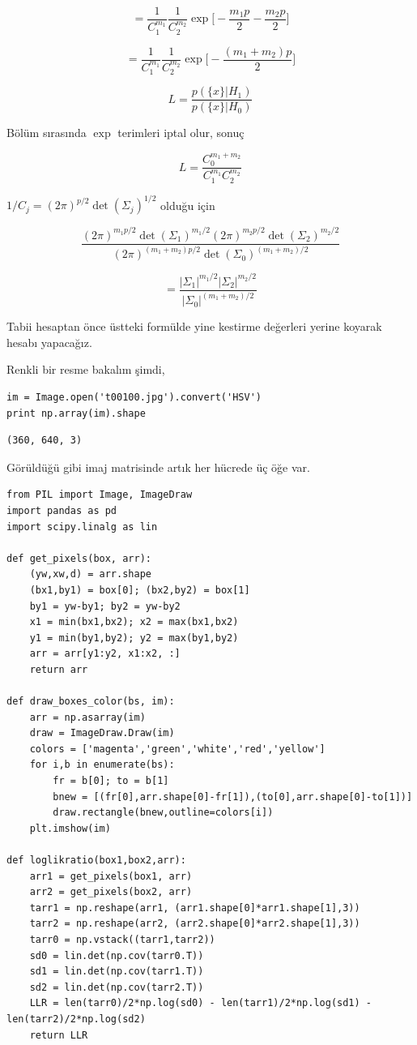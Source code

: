 \documentclass[12pt,fleqn]{article}\usepackage{../../common}
\begin{document}
$$ =
\frac{1}{C_1^{m_1}}\frac{1}{C_2^{m_2}}
\exp\bigg[-\frac{m_1 p}{2} -\frac{m_2 p}{2}\bigg]
$$

$$ =
\frac{1}{C_1^{m_1}}\frac{1}{C_2^{m_2}} \exp\bigg[- \frac{(m_1+m_2) p}{2}\bigg]
$$

$$ L = \frac{p(\{x\}|H_1)}{p(\{x\}|H_0)} $$

Bölüm sırasında $\exp$ terimleri iptal olur, sonuç

$$ L = \frac{C_0^{m_1+m_2}}{C_1^{m_1}C_2^{m_2}  } $$

$1/C_j = (2\pi)^{p/2} \det(\Sigma_j)^{1/2}$ olduğu için

$$
\frac{
  (2\pi)^{m_1 p/2} \det(\Sigma_1)^{m_1/2}
  (2\pi)^{m_2 p/2} \det(\Sigma_2)^{m_2/2}
}
{(2\pi)^{(m_1+m_2) p/2} \det(\Sigma_0)^{(m_1+m_2)/2} }
$$

$$= \frac { |\Sigma_1|^{m_1/2}  |\Sigma_2|^{m_2/2} }{ |\Sigma_0|^{(m_1+m_2)/2} }$$

Tabii hesaptan önce üstteki formülde yine kestirme değerleri yerine koyarak
hesabı yapacağız.

Renkli bir resme bakalım şimdi,

\begin{verbatim}
im = Image.open('t00100.jpg').convert('HSV')
print np.array(im).shape
\end{verbatim}

\begin{verbatim}
(360, 640, 3)
\end{verbatim}

Görüldüğü gibi imaj matrisinde artık her hücrede üç öğe var.

\begin{verbatim}
from PIL import Image, ImageDraw
import pandas as pd
import scipy.linalg as lin

def get_pixels(box, arr):
    (yw,xw,d) = arr.shape
    (bx1,by1) = box[0]; (bx2,by2) = box[1]
    by1 = yw-by1; by2 = yw-by2
    x1 = min(bx1,bx2); x2 = max(bx1,bx2)
    y1 = min(by1,by2); y2 = max(by1,by2)
    arr = arr[y1:y2, x1:x2, :]
    return arr

def draw_boxes_color(bs, im):
    arr = np.asarray(im)
    draw = ImageDraw.Draw(im)
    colors = ['magenta','green','white','red','yellow']
    for i,b in enumerate(bs):
        fr = b[0]; to = b[1]
        bnew = [(fr[0],arr.shape[0]-fr[1]),(to[0],arr.shape[0]-to[1])]
        draw.rectangle(bnew,outline=colors[i])
    plt.imshow(im)
    
def loglikratio(box1,box2,arr):
    arr1 = get_pixels(box1, arr)
    arr2 = get_pixels(box2, arr)
    tarr1 = np.reshape(arr1, (arr1.shape[0]*arr1.shape[1],3))
    tarr2 = np.reshape(arr2, (arr2.shape[0]*arr2.shape[1],3))
    tarr0 = np.vstack((tarr1,tarr2))
    sd0 = lin.det(np.cov(tarr0.T))
    sd1 = lin.det(np.cov(tarr1.T))
    sd2 = lin.det(np.cov(tarr2.T))
    LLR = len(tarr0)/2*np.log(sd0) - len(tarr1)/2*np.log(sd1) - len(tarr2)/2*np.log(sd2)
    return LLR
\end{verbatim}
\end{document}
